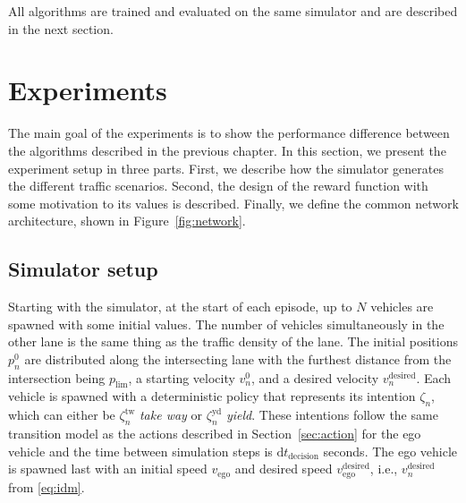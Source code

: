 All algorithms are trained and evaluated on the same simulator and are described in the next section. 

%         

\section{Experiments}
\label{sec:experiments}
The main goal of the experiments is to show the performance difference between the algorithms described in the previous chapter. 
In this section, we present the experiment setup in three parts. First, we describe how the simulator generates the different traffic scenarios. Second, the design of the reward function with some motivation to its values is described. Finally, we define the common network architecture, shown in Figure~\ref{fig:network}.

\subsection{Simulator setup}
\label{sec:simulation_setup}

Starting with the simulator, at the start of each episode, up to $N$ vehicles are spawned with some initial values. The number of vehicles simultaneously in the other lane is the same thing as the traffic density of the lane. The initial positions $p_n^0$ are distributed along the intersecting lane with the furthest distance from the intersection being $p_\mathrm{lim}$, a starting velocity $v_n^0$, and a desired velocity $v^\mathrm{desired}_n$. Each vehicle is spawned with a deterministic policy that represents its intention $\zeta_n$, which can either be $\zeta_n^\mathrm{tw}$ \textit{take way} or $\zeta_n^\mathrm{yd}$ \textit{yield}. These intentions follow the same transition model as the actions described in Section~\ref{sec:action} for the ego vehicle and the time between simulation steps is $\mathrm{d}t_{\text{decision}}$ seconds.
The ego vehicle is spawned last with an initial speed $v_\mathrm{ego}$ and desired speed $v_\mathrm{ego}^\mathrm{desired}$, i.e., $v^\mathrm{desired}_n$ from \eqref{eq:idm}. 

